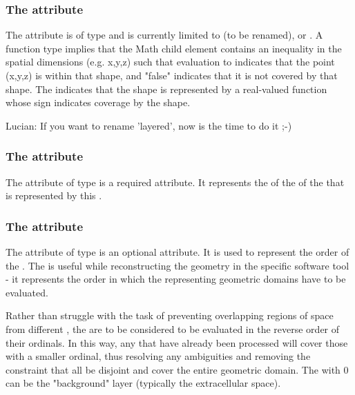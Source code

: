 \subsubsection{The  attribute}
The  attribute is of type  and is currently limited to  (to be renamed), or .  A  function type implies that the Math child element contains an inequality in the spatial dimensions (e.g. x,y,z) such that evaluation to  indicates that the point (x,y,z) is within that shape, and "false" indicates that it is not covered by that shape.  The   indicates that the shape is represented by a real-valued function whose sign indicates coverage by the shape.

{\color{red} Lucian: \notice If you want to rename 'layered', now is the time to do it ;-)}

\subsubsection{The  attribute}
The  attribute of type  is a required attribute. It represents the  of the \DomainType of the \Domain that is represented by this \AnalyticVolume. 

\subsubsection{The  attribute}
The  attribute of type  is an optional attribute. It is used to represent the order of the \AnalyticVolume. The  is useful while reconstructing the geometry in the specific software tool - it represents the order in which the \AnalyticVolumes representing geometric domains have to be evaluated.

Rather than struggle with the task of preventing overlapping regions of space from different \AnalyticVolumes, the \AnalyticVolumes are to be considered to be evaluated in the reverse order of their ordinals.  In this way, any \AnalyticVolumes that have already been processed will cover those with a smaller ordinal, thus resolving any ambiguities and removing the constraint that all \AnalyticVolumes be disjoint and cover the entire geometric domain.  The \AnalyticVolume with  0 can be the "background" layer (typically the extracellular space).  

